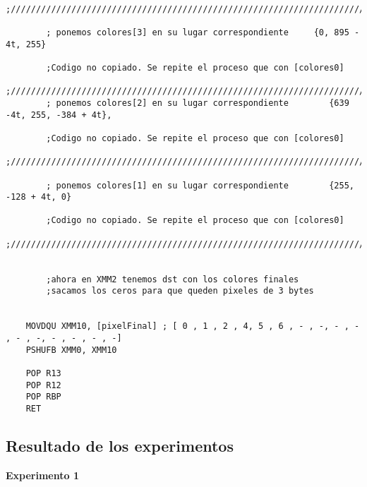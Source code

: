 \begin{codesnippet}
\begin{verbatim}
	;///////////////////////////////////////////////////////////////////////////////

        ; ponemos colores[3] en su lugar correspondiente     {0, 895 - 4t, 255}

        ;Codigo no copiado. Se repite el proceso que con [colores0]
	;//////////////////////////////////////////////////////////////////////////////
        ; ponemos colores[2] en su lugar correspondiente		{639 -4t, 255, -384 + 4t},	

        ;Codigo no copiado. Se repite el proceso que con [colores0]
	;///////////////////////////////////////////////////////////////////////////////

        ; ponemos colores[1] en su lugar correspondiente		{255, -128 + 4t, 0}

        ;Codigo no copiado. Se repite el proceso que con [colores0]
	;///////////////////////////////////////////////////////////////////////////////	
    
    
        ;ahora en XMM2 tenemos dst con los colores finales
        ;sacamos los ceros para que queden pixeles de 3 bytes
        
        
    MOVDQU XMM10, [pixelFinal] ; [ 0 , 1 , 2 , 4, 5 , 6 , - , -, - , - , - , -, - , - , - , -]
    PSHUFB XMM0, XMM10
    
    POP R13
    POP R12
    POP RBP
    RET
\end{verbatim}
\end{codesnippet}

\subsection{Resultado de los experimentos}
\vspace*{0.3cm} \noindent
\textbf{Experimento 1}




%
%



